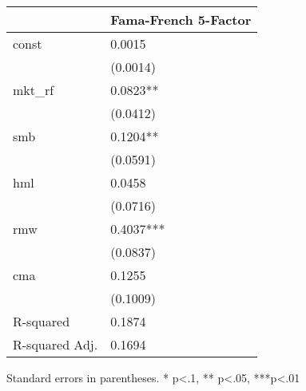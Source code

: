\begin{table}
\caption{}
\label{}
\begin{center}
\begin{tabular}{ll}
\hline
               & Fama-French 5-Factor  \\
\hline
const          & 0.0015                \\
               & (0.0014)              \\
mkt\_rf        & 0.0823**              \\
               & (0.0412)              \\
smb            & 0.1204**              \\
               & (0.0591)              \\
hml            & 0.0458                \\
               & (0.0716)              \\
rmw            & 0.4037***             \\
               & (0.0837)              \\
cma            & 0.1255                \\
               & (0.1009)              \\
R-squared      & 0.1874                \\
R-squared Adj. & 0.1694                \\
\hline
\end{tabular}
\end{center}
\end{table}
\bigskip
Standard errors in parentheses. \newline 
* p<.1, ** p<.05, ***p<.01